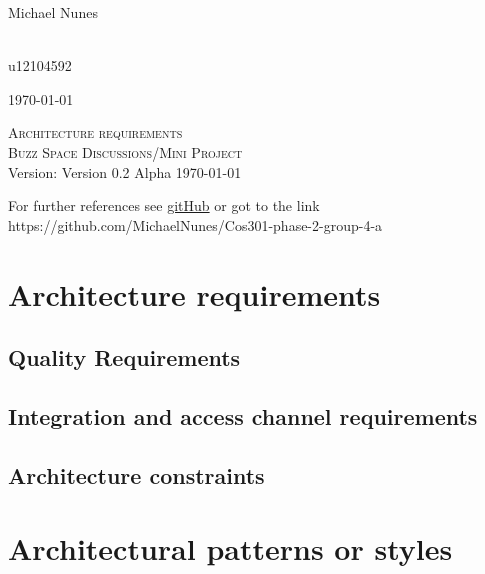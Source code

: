 \documentclass[a4paper,12pt]{report}
\begin{document}
\begin{titlepage}
\begin{center}
\begin{minipage}{0.4\textwidth}
\end{minipage}
\begin{minipage}{0.4\textwidth}
\begin{flushleft} \large
Michael {Nunes}
\end{flushleft}
\end{minipage}
\begin{minipage}{0.4\textwidth}
\begin{flushright} \large
\emph{} \\
u12104592
\end{flushright}
\end{minipage}
\vfill
{\large \today}
\end{center}
\end{titlepage}
\footnotesize
%
\normalsize

\renewcommand{\thesection}{\arabic{section}}
\newpage
\begin{center}
\textsc{\LARGE Architecture requirements}\\[1.5cm]
\textsc{\Large Buzz Space Discussions/Mini Project}\\[0.5cm]
Version: Version 0.2 Alpha 
\today
\end{center}
\tableofcontents{}
For further references see \href{https://github.com/MichaelNunes/Cos301-phase-2-group-4-a}{gitHub} or got to the link https://github.com/MichaelNunes/Cos301-phase-2-group-4-a

\section{Architecture requirements}

\subsection{Quality Requirements}
	
\subsection{Integration and access channel requirements}
	
\subsection{Architecture constraints}
	
\section{Architectural patterns or styles}
	
\end{document}
